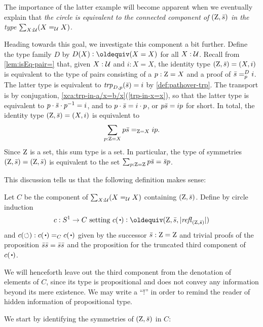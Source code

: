 The importance of the latter example will become apparent when we eventually 
explain that \emph{the circle is equivalent to the connected component of 
$(\mathrm{Z},\bar {s})$ in the type $\sum_{X:\mathcal{U}}(X=_{\mathcal{U}}X)$}. 

Heading towards this goal, we investigate this component a bit further.
Define the type family $D$ by $D(X) \defeq (X=X)$ for all $X:\mathcal{U}$.
Recall from \cref{lem:isEq-pair=} that, given $X:\mathcal{U}$ and $i: X=X$, 
the identity type $(\mathrm{Z},\bar {s}) = (X,i)$
is equivalent to the type of pairs consisting of a $p:\mathrm{Z}=X$ and 
a proof of $\bar {s} =^{D}_{p} i$. The latter type is
equivalent to $\mathop{\mathit{trp}_{D,p}}(\bar {s}) = i$ by \cref{def:pathover-trp}.
The transport is by conjugation,
\cref{xca:trp-in-a/x=b/x}(\ref{trp-in-x=x}), so that the latter
type is equivalent to $p\cdot\bar {s}\cdot p^{-1} = i$, 
and to $p\cdot\bar {s} = i\cdot p$, or $p \bar {s} = i p$ for short. 
In total, the identity type $(\mathrm{Z},\bar {s})=(X,i)$ is equivalent to
\[
\sum_{p: {\mathrm{Z} = X}} {p \bar {s}} =_{\mathrm{Z}=X} {i p}.
\] 
Since $\mathrm{Z}$ is a set, this sum type is a set.
In particular, the type of symmetries $(\mathrm{Z},\bar {s})=(\mathrm{Z},\bar {s})$
is equivalent to the set $\sum_{p:\mathrm{Z}=\mathrm{Z}}p\bar {s}=\bar {s}p$.  


This discussion tells us that the following definition makes sense:

\begin{definition}\label{def:S1toC}
Let $C$ be the component of $\sum_{X:\mathcal{U}}(X=_{\mathcal{U}}X)$ containing $(\mathrm{Z},\bar {s})$.
Define by circle induction
\[
c:\Sc\to C \text{~setting~} 
c(\base)\defequi (\zet,\etop{s},\trunc{\refl{(\zet,\etop{s})}})
\]
and $c(\Sloop): c(\base)=_C c(\base)$ given by the successor 
$\bar {s}:\mathrm{Z}=\mathrm{Z}$ and trivial proofs of the proposition
$\bar {s}\bar {s}=\bar {s}\bar {s}$ and the proposition for the 
truncated third component of $c(\base)$.
\end{definition}

We will henceforth leave out the third component from the denotation
of elements of $C$, since its type is propositional and does not convey 
any information beyond its mere existence. We may write a ``!'' in order
to remind the reader of hidden information of propositional type.
  
We start by identifying the symmetries of $(\mathrm{Z},\bar {s})$ in $C$:

